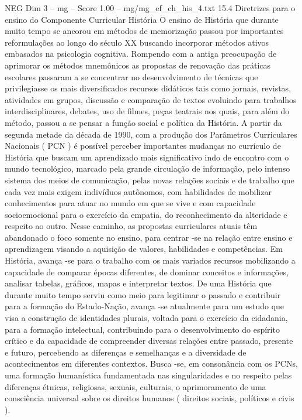 \begin{textsample}{NEG Dim 3 – mg – Score 1.00 – mg/mg\_ef\_ch\_his\_4.txt}  \label{ex:f3_neg_026}
15.4 Diretrizes para o ensino do Componente Curricular História O ensino de História que durante muito tempo se ancorou em métodos de memorização passou por importantes reformulações ao longo do século XX buscando incorporar métodos ativos embasados na psicologia cognitiva.
Rompendo com a antiga preocupação de aprimorar os métodos mnemônicos as propostas de renovação das práticas escolares passaram a se concentrar no desenvolvimento de técnicas que privilegiasse os mais diversificados recursos didáticos tais como jornais, revistas, atividades em grupos, discussão e comparação de textos evoluindo para trabalhos interdisciplinares, debates, uso de filmes, peças teatrais nos quais, para além do método, passou a se pensar a função social e política da História.
A partir da segunda metade da década de 1990, com a produção dos Parâmetros Curriculares Nacionais ( PCN ) é possível perceber importantes mudanças no currículo de História que buscam um aprendizado mais significativo indo de encontro com o mundo tecnológico, marcado pela grande circulação de informação, pelo intenso sistema dos meios de comunicação, pelas novas relações sociais e de trabalho que cada vez mais exigem indivíduos autônomos, com habilidades de mobilizar conhecimentos para atuar no mundo em que se vive e com capacidade socioemocional para o exercício da empatia, do reconhecimento da alteridade e respeito ao outro.
Nesse caminho, as propostas curriculares atuais têm abandonado o foco somente no ensino, para centrar -se na relação entre ensino e aprendizagem visando a aquisição de valores, habilidades e competências.
Em História, avança -se para o trabalho com os mais variados recursos mobilizando a capacidade de comparar épocas diferentes, de dominar conceitos e informações, analisar tabelas, gráficos, mapas e interpretar textos.
De uma História que durante muito tempo serviu como meio para legitimar o passado e contribuir para a formação do Estado-Nação, avança -se atualmente para um estudo que visa a construção de identidades plurais, voltada para o exercício da cidadania, para a formação intelectual, contribuindo para o desenvolvimento do espírito crítico e da capacidade de compreender diversas relações entre passado, presente e futuro, percebendo as diferenças e semelhanças e a diversidade de acontecimentos em diferentes contextos.
Busca -se, em consonância com os PCNs, uma formação humanística fundamentada nas singularidades e no respeito pelas diferenças étnicas, religiosas, sexuais, culturais, o aprimoramento de uma consciência universal sobre os direitos humanos ( direitos sociais, políticos e civis ).

\end{textsample}
